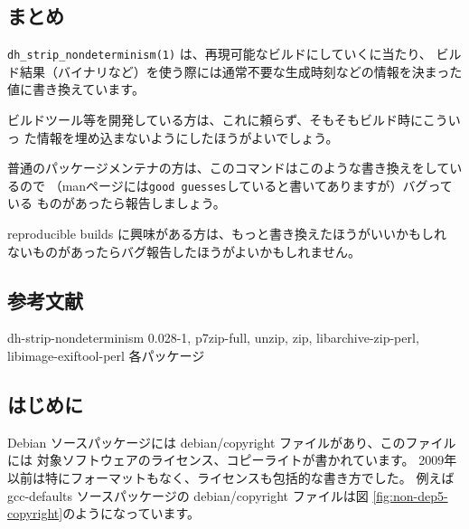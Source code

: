 \documentclass[mingoth,a4paper]{jsarticle}
\begin{document}
\subsection{まとめ}

\verb|dh_strip_nondeterminism(1)| は、再現可能なビルドにしていくに当たり、
ビルド結果（バイナリなど）を使う際には通常不要な生成時刻などの情報を決まった
値に書き換えています。

ビルドツール等を開発している方は、これに頼らず、そもそもビルド時にこういっ
た情報を埋め込まないようにしたほうがよいでしょう。

普通のパッケージメンテナの方は、このコマンドはこのような書き換えをしているので
（manページには\verb|good guesses|していると書いてありますが）バグっている
ものがあったら報告しましょう。

reproducible builds に興味がある方は、もっと書き換えたほうがいいかもしれ
ないものがあったらバグ報告したほうがよいかもしれません。

\subsection{参考文献}

dh-strip-nondeterminism 0.028-1, p7zip-full, unzip, zip, libarchive-zip-perl,
libimage-exiftool-perl 各パッケージ


\subsection{はじめに}

Debian ソースパッケージには debian/copyright ファイルがあり、このファイルには
対象ソフトウェアのライセンス、コピーライトが書かれています。
2009年以前は特にフォーマットもなく、ライセンスも包括的な書き方でした。
例えば gcc-defaults ソースパッケージの debian/copyright ファイルは図
\ref{fig:non-dep5-copyright}のようになっています。
\end{document}
